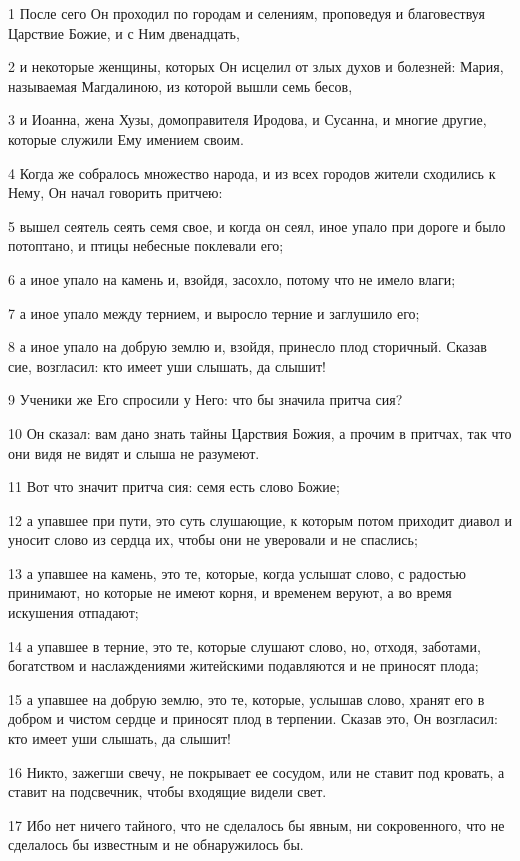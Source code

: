 \par 1 После сего Он проходил по городам и селениям, проповедуя и благовествуя Царствие Божие, и с Ним двенадцать,
\par 2 и некоторые женщины, которых Он исцелил от злых духов и болезней: Мария, называемая Магдалиною, из которой вышли семь бесов,
\par 3 и Иоанна, жена Хузы, домоправителя Иродова, и Сусанна, и многие другие, которые служили Ему имением своим.
\par 4 Когда же собралось множество народа, и из всех городов жители сходились к Нему, Он начал говорить притчею:
\par 5 вышел сеятель сеять семя свое, и когда он сеял, иное упало при дороге и было потоптано, и птицы небесные поклевали его;
\par 6 а иное упало на камень и, взойдя, засохло, потому что не имело влаги;
\par 7 а иное упало между тернием, и выросло терние и заглушило его;
\par 8 а иное упало на добрую землю и, взойдя, принесло плод сторичный. Сказав сие, возгласил: кто имеет уши слышать, да слышит!
\par 9 Ученики же Его спросили у Него: что бы значила притча сия?
\par 10 Он сказал: вам дано знать тайны Царствия Божия, а прочим в притчах, так что они видя не видят и слыша не разумеют.
\par 11 Вот что значит притча сия: семя есть слово Божие;
\par 12 а упавшее при пути, это суть слушающие, к которым потом приходит диавол и уносит слово из сердца их, чтобы они не уверовали и не спаслись;
\par 13 а упавшее на камень, это те, которые, когда услышат слово, с радостью принимают, но которые не имеют корня, и временем веруют, а во время искушения отпадают;
\par 14 а упавшее в терние, это те, которые слушают слово, но, отходя, заботами, богатством и наслаждениями житейскими подавляются и не приносят плода;
\par 15 а упавшее на добрую землю, это те, которые, услышав слово, хранят его в добром и чистом сердце и приносят плод в терпении. Сказав это, Он возгласил: кто имеет уши слышать, да слышит!
\par 16 Никто, зажегши свечу, не покрывает ее сосудом, или не ставит под кровать, а ставит на подсвечник, чтобы входящие видели свет.
\par 17 Ибо нет ничего тайного, что не сделалось бы явным, ни сокровенного, что не сделалось бы известным и не обнаружилось бы.
